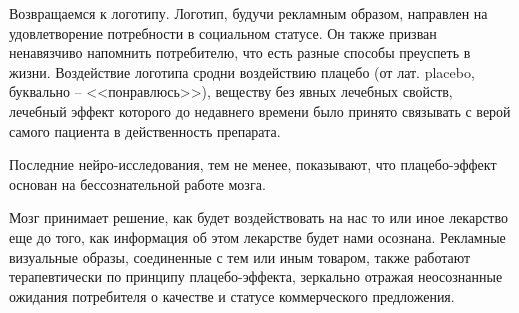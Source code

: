 Возвращаемся к логотипу. Логотип, будучи рекламным образом, направлен на
удовлетворение потребности в социальном статусе. Он также призван ненавязчиво
напомнить потребителю, что есть разные способы преуспеть в жизни. Воздействие
логотипа сродни воздействию плацебо (от лат. placebo, буквально -- <<понравлюсь>>),
веществу без явных лечебных свойств, лечебный эффект которого до недавнего
времени было принято связывать с верой самого пациента в действенность
препарата.

Последние нейро-исследования, тем не менее, показывают, что плацебо-эффект
основан на бессознательной работе
мозга\autocite{jensen2012nonconscious}.

Мозг принимает решение, как будет воздействовать на нас то или иное лекарство
еще до того, как информация об этом лекарстве будет нами осознана. Рекламные
визуальные образы, соединенные с тем или иным товаром, также работают
терапевтически по принципу плацебо-эффекта, зеркально отражая неосознанные
ожидания потребителя о качестве и статусе коммерческого
предложения\autocite{ariely2009predictably}.

